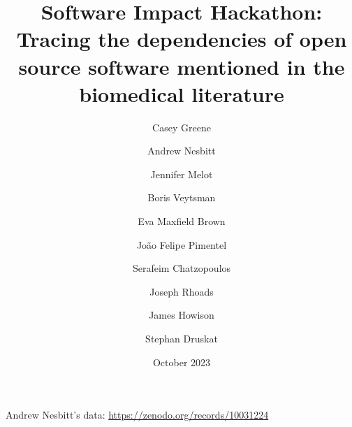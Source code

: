 \documentclass{article}
\title{Software Impact Hackathon:  Tracing the dependencies of open
  source software mentioned in the biomedical literature}
\date{October 2023}
\author{Casey Greene \and
Andrew Nesbitt \and
Jennifer Melot \and
Boris Veytsman \and
Eva Maxfield Brown \and
João Felipe Pimentel \and
Serafeim Chatzopoulos \and
Joseph Rhoads \and
James Howison \and
Stephan Druskat}
\begin{document}
\maketitle

Andrew Nesbitt's data: \url{https://zenodo.org/records/10031224}
\end{document}
